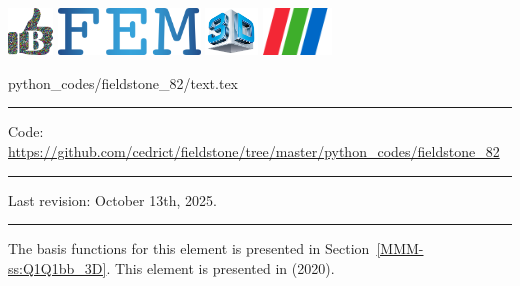 \noindent
\includegraphics[height=1.25cm]{images/pictograms/benchmark}
\includegraphics[height=1.25cm]{images/pictograms/FEM}
\includegraphics[height=1.25cm]{images/pictograms/3d}
\includegraphics[height=1.25cm]{images/pictograms/paraview}


\begin{flushright} {\tiny {\color{gray} python\_codes/fieldstone\_82/text.tex}} \end{flushright}

%

\par\noindent\rule{\textwidth}{0.4pt}

\begin{center}
\inpython
{\small Code: \url{https://github.com/cedrict/fieldstone/tree/master/python_codes/fieldstone_82}}
\end{center}

\par\noindent\rule{\textwidth}{0.4pt}

Last revision: October 13th, 2025.

\par\noindent\rule{\textwidth}{0.4pt}


The basis functions for this element is presented in Section~\ref{MMM-ss:Q1Q1bb_3D}.
This element is presented in \textcite{kahp20} (2020). 

